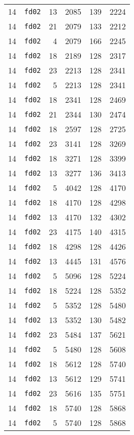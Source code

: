 \documentclass{article}
\begin{document}
\begin{table}[h!]
\begin{tabular}{llrrrl}
    14 & \texttt{fd02} & 13 & 2085 & 139 & 2224 \\
    14 & \texttt{fd02} & 21 & 2079 & 133 & 2212 \\
    14 & \texttt{fd02} & 4 & 2079 & 166 & 2245 \\
    14 & \texttt{fd02} & 18 & 2189 & 128 & 2317 \\
    14 & \texttt{fd02} & 23 & 2213 & 128 & 2341 \\
    14 & \texttt{fd02} & 5 & 2213 & 128 & 2341 \\
    14 & \texttt{fd02} & 18 & 2341 & 128 & 2469 \\
    14 & \texttt{fd02} & 21 & 2344 & 130 & 2474 \\
    14 & \texttt{fd02} & 18 & 2597 & 128 & 2725 \\
    14 & \texttt{fd02} & 23 & 3141 & 128 & 3269 \\
    14 & \texttt{fd02} & 18 & 3271 & 128 & 3399 \\
    14 & \texttt{fd02} & 13 & 3277 & 136 & 3413 \\
    14 & \texttt{fd02} & 5 & 4042 & 128 & 4170 \\
    14 & \texttt{fd02} & 18 & 4170 & 128 & 4298 \\
    14 & \texttt{fd02} & 13 & 4170 & 132 & 4302 \\
    14 & \texttt{fd02} & 23 & 4175 & 140 & 4315 \\
    14 & \texttt{fd02} & 18 & 4298 & 128 & 4426 \\
    14 & \texttt{fd02} & 13 & 4445 & 131 & 4576 \\
    14 & \texttt{fd02} & 5 & 5096 & 128 & 5224 \\
    14 & \texttt{fd02} & 18 & 5224 & 128 & 5352 \\
    14 & \texttt{fd02} & 5 & 5352 & 128 & 5480 \\
    14 & \texttt{fd02} & 13 & 5352 & 130 & 5482 \\
    14 & \texttt{fd02} & 23 & 5484 & 137 & 5621 \\
    14 & \texttt{fd02} & 5 & 5480 & 128 & 5608 \\
    14 & \texttt{fd02} & 18 & 5612 & 128 & 5740 \\
    14 & \texttt{fd02} & 13 & 5612 & 129 & 5741 \\
    14 & \texttt{fd02} & 23 & 5616 & 135 & 5751 \\
    14 & \texttt{fd02} & 18 & 5740 & 128 & 5868 \\
    14 & \texttt{fd02} & 5 & 5740 & 128 & 5868 \\

\end{tabular}
\end{table}
\end{document}
